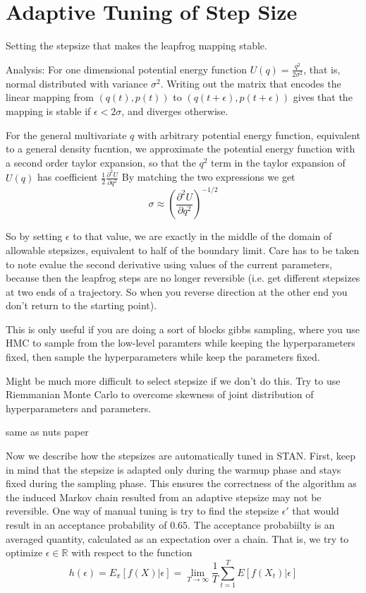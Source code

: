 \documentclass[]{report}
\begin{document}
\section{Adaptive Tuning of Step Size}

Setting the stepsize that makes the leapfrog mapping stable.

Analysis: For one dimensional potential energy function $U(q) = \frac{q^2}{2\sigma^2}$,
that is, normal distributed with variance $\sigma^2$. Writing out the matrix that encodes the linear mapping from $(q(t),p(t))$ to $(q(t+\epsilon),p(t+\epsilon))$ gives that the mapping is stable if $\epsilon < 2 \sigma$, and diverges otherwise. 

For the general multivariate $q$ with arbitrary potential energy function, equivalent to a general density fucntion, we approximate the potential energy function with a second order taylor expansion, so that the $q^2$ term in the taylor expansion of $U(q)$ has coefficient $\frac{1}{2} \frac{\partial^2 U}{\partial q^2}$  
By matching the two expressions we get 
\[ \sigma \approx ( \frac{\partial^2 U}{\partial q^2})^{-1/2} \]

So by setting $\epsilon$ to that value, we are exactly in the middle of the domain of allowable stepsizes, equivalent to half of the boundary limit.
Care has to be taken to note evalue the second derivative using values of the current parameters, because then the leapfrog steps are no longer reversible (i.e. get different stepsizes at two ends of a trajectory. So when you reverse direction at the other end you don't return to  the starting point). 

This is only useful if you are doing a sort of blocks gibbs sampling, where you use HMC to sample from the low-level paramters while keeping the hyperparameters fixed, then sample the hyperparameters while keep the parameters fixed. 

Might be much more difficult to select stepsize if we don't do this. Try to use Riemmanian Monte Carlo to overcome skewness of joint distribution of hyperparameters and parameters. 

same as nuts paper 



Now we describe how the stepsizes are automatically tuned in STAN. First, keep
in mind that the stepsize is adapted only during the warmup phase and stays
fixed during the sampling phase. This ensures the correctness of the algorithm
as the induced Markov chain resulted from an adaptive stepsize may not be
reversible. One way of manual tuning is try to find the stepsize
$\epsilon'$ that would result in an acceptance probability of $0.65$. The
acceptance probabiilty is an averaged quantity, calculated as an expectation
over a chain. That is, we try to optimize $\epsilon \in \mathbb{R}$ with respect
to the function 
\[ h(\epsilon) = E_\pi[f(X)|\epsilon]  = \lim_{T \rightarrow \infty} \frac{1}{T}
\sum_{t=1}^T E[f(X_t)|\epsilon] \]
\end{document}
